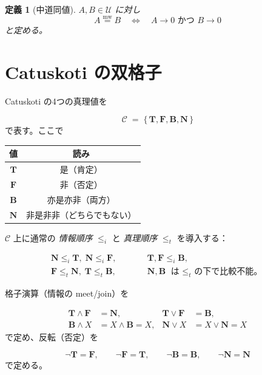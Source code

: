 \documentclass[12pt,a4paper]{article}
\newcommand{\dfix}{\mathfrak{0}}          %
\newcommand{\mw}{\mathrel{\overset{\mathrm{mw}}{=}}} %
\newtheorem{definition}{定義}[section]
\begin{document}
\begin{definition}[中道同値]
$A,B\in\mathcal{U}$ に対し
\[
A\mw B
\quad\Longleftrightarrow\quad
A\to\dfix\text{ かつ }B\to\dfix
\]
と定める。
\end{definition}

\section{Catuskoti の双格子}

Catuskoti の4つの真理値を

$$
\mathcal{C}\;=\;\{\,\mathbf{T},\mathbf{F},
                 \mathbf{B},\mathbf{N}\,\}
$$
で表す。ここで

\begin{center}
\begin{tabular}{c|c}
値 & 読み \\ \hline
$\mathbf{T}$ & 是（肯定） \\
$\mathbf{F}$ & 非（否定） \\
$\mathbf{B}$ & 亦是亦非（両方） \\
$\mathbf{N}$ & 非是非非（どちらでもない） \\
\end{tabular}
\end{center}

$\mathcal{C}$ 上に通常の \emph{情報順序} $\le_i$ と \emph{真理順序} $\le_t$ を導入する：

$$
\begin{array}{ccl}
\mathbf{N}\le_i\mathbf{T},\;\mathbf{N}\le_i\mathbf{F},
&\qquad&
\mathbf{T},\mathbf{F}\le_i\mathbf{B},\\[2mm]
\mathbf{F}\le_t\mathbf{N},\;
\mathbf{T}\le_t\mathbf{B},
&\qquad&
\mathbf{N},\mathbf{B}\text{ は $\le_t$ の下で比較不能。}
\end{array}
$$

格子演算（情報の meet/join）を

$$
\begin{aligned}
\mathbf{T}\wedge\mathbf{F}&=\mathbf{N}, &
\mathbf{T}\vee\mathbf{F}&=\mathbf{B},\\
\mathbf{B}\wedge X&=X\wedge\mathbf{B}=X, &
\mathbf{N}\vee X&=X\vee\mathbf{N}=X
\end{aligned}
$$
で定め、反転（否定）を

$$
\neg\mathbf{T}=\mathbf{F},\qquad
\neg\mathbf{F}=\mathbf{T},\qquad
\neg\mathbf{B}=\mathbf{B},\qquad
\neg\mathbf{N}=\mathbf{N}
$$
で定める。
\end{document}
